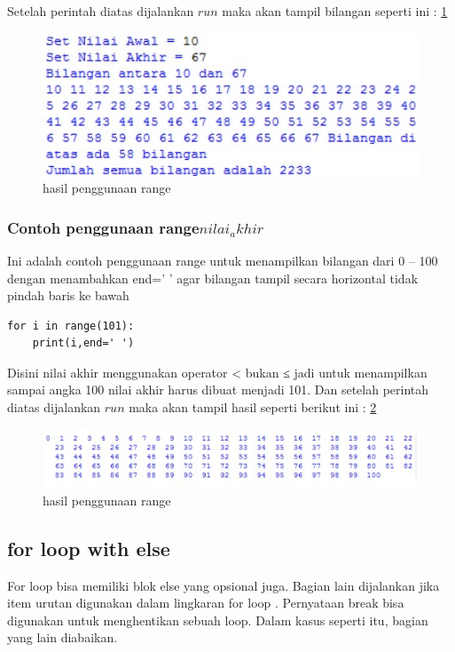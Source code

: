 Setelah perintah diatas dijalankan \(run\) maka akan tampil bilangan seperti ini :
\ref{2range2}

\begin{figure}[ht]
    \centerline{\includegraphics[width=1\textwidth]{figures/2range2.JPG}}
    \caption{hasil penggunaan range}
    \label{2range2}
    \end{figure}
    
\subsubsection{Contoh penggunaan range\(nilai_akhir\)}
Ini adalah contoh penggunaan range untuk menampilkan bilangan dari 0 – 100 dengan menambahkan end=’ ’ agar bilangan tampil secara horizontal tidak pindah baris ke bawah
\begin{verbatim}
for i in range(101):
	print(i,end=' ')
\end{verbatim}
Disini nilai akhir menggunakan operator < bukan ≤ jadi untuk menampilkan sampai angka 100 nilai akhir harus dibuat menjadi 101. Dan setelah perintah diatas dijalankan \(run\) maka akan tampil hasil seperti berikut ini :
\ref{2range3}

\begin{figure}[ht]
    \centerline{\includegraphics[width=1\textwidth]{figures/2range3.JPG}}
    \caption{hasil penggunaan range}
    \label{2range3}
    \end{figure}

\subsection{for loop with else}
For loop bisa memiliki blok else yang opsional juga. Bagian lain dijalankan jika item urutan digunakan dalam lingkaran for loop .
Pernyataan break bisa digunakan untuk menghentikan sebuah loop. Dalam kasus seperti itu, bagian yang lain diabaikan.


